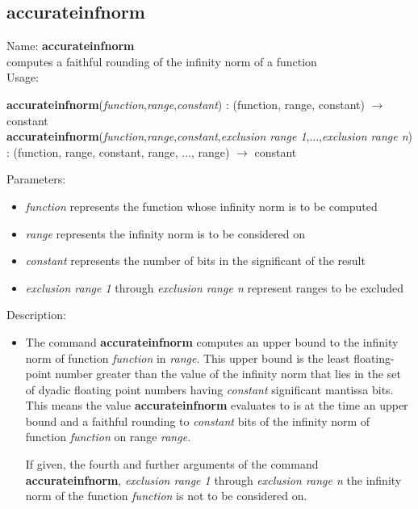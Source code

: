 \subsection{accurateinfnorm}
\label{labaccurateinfnorm}
\noindent Name: \textbf{accurateinfnorm}\\
computes a faithful rounding of the infinity norm of a function \\
\noindent Usage: 
\begin{center}
\textbf{accurateinfnorm}(\emph{function},\emph{range},\emph{constant}) : (\textsf{function}, \textsf{range}, \textsf{constant}) $\rightarrow$ \textsf{constant}\\
\textbf{accurateinfnorm}(\emph{function},\emph{range},\emph{constant},\emph{exclusion range 1},...,\emph{exclusion range n}) : (\textsf{function}, \textsf{range}, \textsf{constant}, \textsf{range}, ..., \textsf{range}) $\rightarrow$ \textsf{constant}\\
\end{center}
Parameters: 
\begin{itemize}
\item \emph{function} represents the function whose infinity norm is to be computed
\item \emph{range} represents the infinity norm is to be considered on
\item \emph{constant} represents the number of bits in the significant of the result
\item \emph{exclusion range 1} through \emph{exclusion range n} represent ranges to be excluded 
\end{itemize}
\noindent Description: \begin{itemize}

\item The command \textbf{accurateinfnorm} computes an upper bound to the infinity norm of
   function \emph{function} in \emph{range}. This upper bound is the least
   floating-point number greater than the value of the infinity norm that
   lies in the set of dyadic floating point numbers having \emph{constant}
   significant mantissa bits. This means the value \textbf{accurateinfnorm} evaluates to
   is at the time an upper bound and a faithful rounding to \emph{constant}
   bits of the infinity norm of function \emph{function} on range \emph{range}.
    
   If given, the fourth and further arguments of the command \textbf{accurateinfnorm},
   \emph{exclusion range 1} through \emph{exclusion range n} the infinity norm of
   the function \emph{function} is not to be considered on.
\end{itemize}
